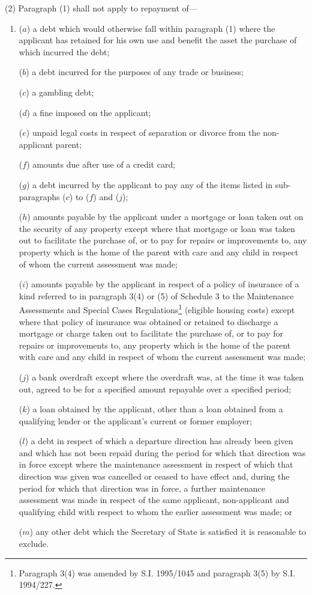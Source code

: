 \documentclass[12pt,a4paper]{article}
\begin{document}
(2) Paragraph (1) shall not apply to repayment of—
\begin{enumerate}\item[]
($a$) a debt which would otherwise fall within paragraph (1) where the applicant
has retained for his own use and benefit the asset the purchase of which
incurred the debt;

($b$) a debt incurred for the purposes of any trade or business;

($c$) a gambling debt;

($d$) a fine imposed on the applicant;

($e$) unpaid legal costs in respect of separation or divorce from the non-applicant
parent;

($f$) amounts due after use of a credit card;

($g$) a debt incurred by the applicant to pay any of the items listed in
sub-paragraphs ($c$) to ($f$) and ($j$);

($h$) amounts payable by the applicant under a mortgage or loan taken out on the
security of any property except where that mortgage or loan was taken out to
facilitate the purchase of, or to pay for repairs or improvements to, any
property which is the home of the parent with care and any child in respect of
whom the current assessment was made;

($i$) amounts payable by the applicant in respect of a policy of insurance of a
kind referred to in paragraph 3(4) or (5) of Schedule 3 to the Maintenance
Assessments and Special Cases Regulations\footnote{\frenchspacing Paragraph 3(4) was amended by S.I. 1995/1045 and paragraph 3(5) by S.I. 1994/227.} (eligible housing costs) except
where that policy of insurance was obtained or retained to discharge a mortgage
or charge taken out to facilitate the purchase of, or to pay for repairs or
improvements to, any property which is the home of the parent with care and any
child in respect of whom the current assessment was made;

($j$) a bank overdraft except where the overdraft was, at the time it was taken
out, agreed to be for a specified amount repayable over a specified period;

($k$) a loan obtained by the applicant, other than a loan obtained from a
qualifying lender or the applicant’s current or former employer;

($l$) a debt in respect of which a departure direction has already been given and
which has not been repaid during the period for which that direction was in
force except where the maintenance assessment in respect of which that direction
was given was cancelled or ceased to have effect and, during the period for
which that direction was in force, a further maintenance assessment was made in
respect of the same applicant, non-applicant and qualifying child with respect
to whom the earlier assessment was made; or

($m$) any other debt which the Secretary of State is satisfied it is reasonable to
exclude.
\end{enumerate}
\end{document}
